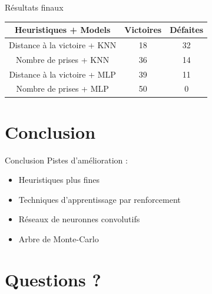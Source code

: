 \documentclass{beamer}
\begin{document}
\begin{frame}{Résultats finaux}
    \begin{center}
        \begin{tabular}{ | c || c | c |}
            \hline 
            Heuristiques + Models & Victoires & Défaites \\
            \hline 
            \hline 
            Distance à la victoire + KNN & 18 & 32 \\
            Nombre de prises + KNN & 36 & 14 \\
            Distance à la victoire + MLP & 39 & 11 \\
            Nombre de prises + MLP & 50 & 0 \\ \hline
        \end{tabular}

    \end{center}
\end{frame}


{\section*{Conclusion}}

\begin{frame}{Conclusion}
    Pistes d'amélioration : 
    \begin{itemize}
        \item Heuristiques plus fines
        \item Techniques d'apprentissage par renforcement
        \item Réseaux de neuronnes convolutifs
        \item Arbre de Monte-Carlo
    \end{itemize}
\end{frame}

\appendix

{\section*{Questions ?}}
\end{document}
